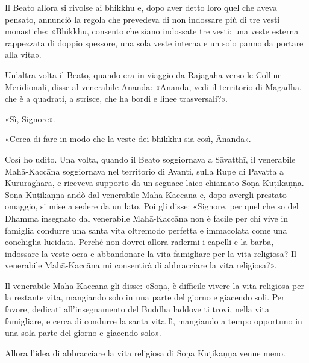 Il Beato allora si rivolse ai bhikkhu e, dopo aver detto loro quel che
aveva pensato, annunciò la regola che prevedeva di non indossare più di
tre vesti monastiche: «Bhikkhu, consento che siano indossate tre vesti:
una veste esterna rappezzata di doppio spessore, una sola veste interna
e un solo panno da portare alla vita».




Un’altra volta il Beato, quando era in viaggio da Rājagaha verso le
Colline Meridionali, disse al venerabile Ānanda: «Ānanda, vedi il
territorio di Magadha, che è a quadrati, a strisce, che ha bordi e linee
trasversali?».


«Sì, Signore».


«Cerca di fare in modo che la veste dei bhikkhu sia così, Ānanda».




 Così ho udito. Una volta, quando il Beato soggiornava a
Sāvatthī, il venerabile Mahā-Kaccāna soggiornava nel territorio di
Avanti, sulla Rupe di Pavatta a Kururaghara, e riceveva supporto da un
seguace laico chiamato Soṇa Kuṭikaṇṇa. Soṇa Kuṭikaṇṇa andò dal
venerabile Mahā-Kaccāna e, dopo avergli prestato omaggio, si mise a
sedere da un lato. Poi gli disse: «Signore, per quel che so del Dhamma
insegnato dal venerabile Mahā-Kaccāna non è facile per chi vive in
famiglia condurre una santa vita oltremodo perfetta e immacolata come
una conchiglia lucidata. Perché non dovrei allora radermi i capelli e la
barba, indossare la veste ocra e abbandonare la vita famigliare per la
vita religiosa? Il venerabile Mahā-Kaccāna mi consentirà di abbracciare
la vita religiosa?».


Il venerabile Mahā-Kaccāna gli disse: «Soṇa, è difficile vivere la vita
religiosa per la restante vita, mangiando solo in una parte del giorno e
giacendo soli. Per favore, dedicati all’insegnamento del Buddha laddove
ti trovi, nella vita famigliare, e cerca di condurre la santa vita lì,
mangiando a tempo opportuno in una sola parte del giorno e giacendo
solo».


Allora l’idea di abbracciare la vita religiosa di Soṇa Kuṭikaṇṇa venne
meno.


